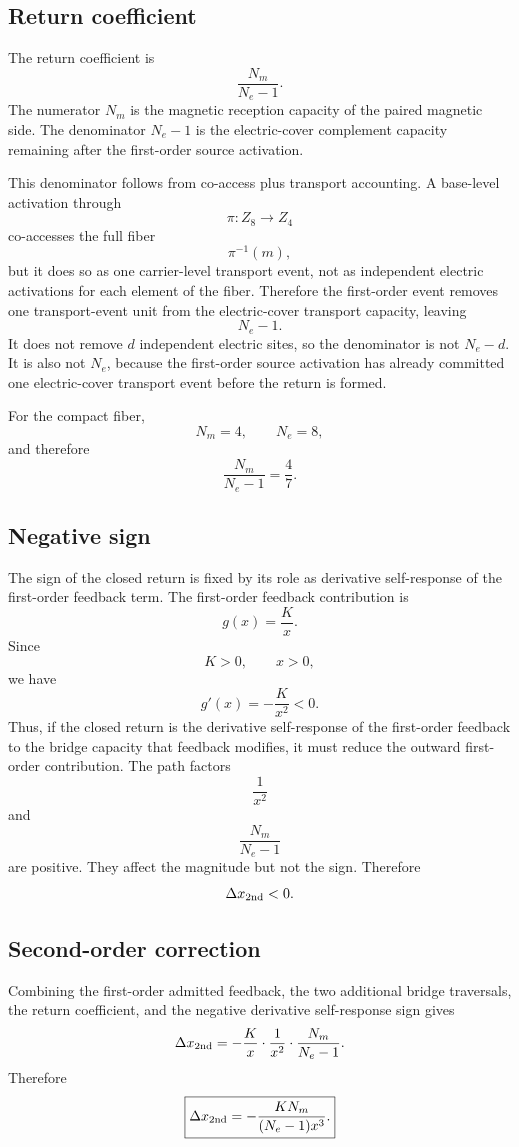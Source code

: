 \subsection{Return coefficient}

The return coefficient is
\[
\frac{N_m}{N_e-1}.
\]
The numerator \(N_m\) is the magnetic reception capacity of the paired
magnetic side. The denominator \(N_e-1\) is the electric-cover complement
capacity remaining after the first-order source activation.

This denominator follows from co-access plus transport accounting. A
base-level activation through
\[
\pi:Z_8\to Z_4
\]
co-accesses the full fiber
\[
\pi^{-1}(m),
\]
but it does so as one carrier-level transport event, not as independent
electric activations for each element of the fiber. Therefore the
first-order event removes one transport-event unit from the electric-cover
transport capacity, leaving
\[
N_e-1.
\]
It does not remove \(d\) independent electric sites, so the denominator
is not \(N_e-d\). It is also not \(N_e\), because the first-order source
activation has already committed one electric-cover transport event
before the return is formed.

For the compact fiber,
\[
N_m=4,
\qquad
N_e=8,
\]
and therefore
\[
\frac{N_m}{N_e-1}
=
\frac47.
\]

\subsection{Negative sign}

The sign of the closed return is fixed by its role as derivative
self-response of the first-order feedback term. The first-order feedback
contribution is
\[
g(x)=\frac{K}{x}.
\]
Since
\[
K>0,
\qquad
x>0,
\]
we have
\[
g'(x)=-\frac{K}{x^2}<0.
\]
Thus, if the closed return is the derivative self-response of the
first-order feedback to the bridge capacity that feedback modifies, it
must reduce the outward first-order contribution. The path factors
\[
\frac1{x^2}
\]
and
\[
\frac{N_m}{N_e-1}
\]
are positive. They affect the magnitude but not the sign. Therefore
\[
\Delta x_{\rm 2nd}<0.
\]

\subsection{Second-order correction}

Combining the first-order admitted feedback, the two additional bridge
traversals, the return coefficient, and the negative derivative
self-response sign gives
\[
\Delta x_{\rm 2nd}
=
-\frac{K}{x}
\cdot
\frac1{x^2}
\cdot
\frac{N_m}{N_e-1}.
\]
Therefore
\[
\boxed{
\Delta x_{\rm 2nd}
=
-\frac{K N_m}{(N_e-1)x^3}.
}
\]

